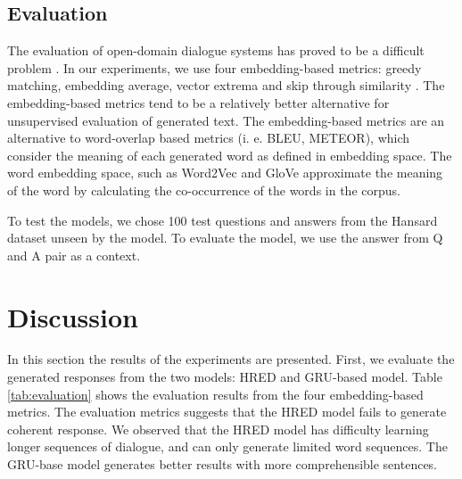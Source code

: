 \subsection{Evaluation}
The evaluation of open-domain dialogue systems has proved to be a difficult problem \cite{DBLP:journals/corr/GalleyBSJAQMGD15}. In our experiments, we use four embedding-based metrics: greedy matching, embedding average, vector extrema and skip through similarity  \cite{DBLP:journals/corr/LiuLSNCP16}. The embedding-based metrics tend to be a relatively better alternative for unsupervised evaluation of generated text. The embedding-based metrics are an alternative to word-overlap based metrics (i. e. BLEU, METEOR), which consider the meaning of each generated word as defined in embedding space. The word embedding space, such as Word2Vec \cite{DBLP:mikoloveW2V} and GloVe \cite{pennington2014glove} approximate the meaning of the word by calculating the co-occurrence of the words in the corpus. 

To test the models, we chose 100 test questions and answers from the Hansard dataset unseen by the model. To evaluate the model, we use the answer from Q and A pair as a context.

\section{Discussion}
In this section the results of the experiments are presented. First, we evaluate the generated responses from the two models: HRED and GRU-based model. Table \ref{tab:evaluation} shows the evaluation results from the four embedding-based metrics. The evaluation metrics suggests that the HRED model fails to generate coherent response. We observed that the HRED model has difficulty learning longer sequences of dialogue, and can only generate limited word sequences. The GRU-base model generates better results with more comprehensible sentences. 

\begin{table}
\centering
\caption{Dialogue response evaluation - Cosine Similarity (CS)}

\label{tab:evaluation}
\end{table}



